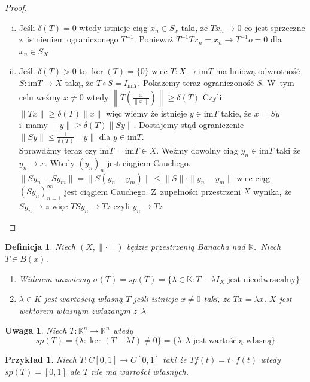 \documentclass[11pt]{mwrep}
\renewcommand{\[}{\begin{equation}}
\renewcommand{\]}{\end{equation}}
\newcommand{\K}{\ensuremath{\mathbb{K}}}
\newcommand{\norm}{\|\cdot\|}
\newcommand{\spac}[1][X]{$(#1,\norm)$ }
\newcommand{\im}{\mathrm{im}}
\newtheorem{uwaga}[subsection]{Uwaga}
\newtheorem{de}[subsection]{Definicja}
\newtheorem{ex}[subsection]{Przykład}
\newcounter{numer}
\begin{document}
\begin{proof}
	\begin{enumerate}[(i)]
		\item Jeśli $ \delta(T) =0$ wtedy istnieje ciąg $x_n \in S_x$ taki, że $T{x_{n}}\to 0$ co jest sprzeczne 
			z~istnieniem ograniczonego $T^{-1}$.  Ponieważ $ T^{-1 }T x_n = x_n \to T^{-1}o = 0$ dla $x_n \in S_X$ 
		\item Jeśli $\delta(T)>0$ to $\ker(T) = \{0\}$ wiec $ T\colon X \to \im T$ ma liniową odwrotność
			$S\colon \im T \to X$ taką, że $T\circ S = I_{\im T}$.
			Pokażemy teraz ograniczoność $S$. W~tym celu weźmy $x\not = 0$ wtedy $\left\|T\left( \frac{x}{\|x\|} \right)\right\|\ge \delta(T)$
			Czyli $\|Tx\| \ge \delta(T) \|x\|$ więc wiemy że istnieje $y\in \im T$ takie, że $x=Sy$ i~mamy 
			$\|y\|\ge \delta(T) \|Sy\|$.
			Dostajemy stąd ograniczenie $\|Sy\| \le \frac{1}{\delta(T)}\|y\|$ dla $y\in \im T$.\\
			Sprawdźmy teraz czy $\overline{\im T} = \im T \in X$.
			Weźmy dowolny ciąg $y_n \in \im T$ taki że $y_n \to x$.  Wtedy $(y_n)_n$ jest ciągiem Cauchego. 
			$\|S{y_n} - S{y_m}\|=\|S(y_n - y_m)\|\le \|S\| \cdot \|y_n -y_m\|$ wiec ciąg $(S y_n)_{n=1}^\infty$ jest ciągiem Cauchego.
			Z~zupełności przestrzeni $X$ wynika, że $S y_n \to z$ więc $T S y_n \to T z$ czyli $y_n \to Tz$ 
	\end{enumerate}
\end{proof}
\begin{de}
	Niech \spac będzie przestrzenią Banacha nad \K.~Niech $T \in B(x)$.
	\begin{enumerate}
		\item Widmem nazwiemy $\sigma(T) = sp(T) = \{ \lambda \in \K : T -\lambda I_X \textrm{ jest nieodwracalny}\}$ 
		\item $\lambda\in K$ jest wartością własną $T$ jeśli istnieje $x\not  =0$ taki, że $Tx = \lambda x$. 
			$X$ jest wektorem  własnym zwiazanym z~$\lambda$
	\end{enumerate}
\end{de}
\begin{uwaga}
	Niech $T\colon \K^n \to \K^n$ wtedy $$sp(T) = \{\lambda: \ker(T-\lambda I) \not = 0\} = \{\lambda :\lambda \textrm{ jest wartością własną} \}$$
\end{uwaga}
\begin{ex}
	Niech $T\colon C[0,1] \to C[0,1]$ taki że $Tf(t) = t\cdot f(t)$ wtedy $sp(T) = [0,1]$ ale $T$ nie ma wartości własnych.
\end{ex}
\end{document}
